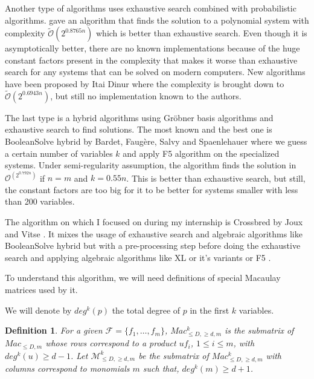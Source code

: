 \documentclass[english]{article}
\newtheorem{definition}{Definition}[section]
\begin{document}
		Another type of algorithms uses exhaustive search combined with probabilistic algorithms. \cite{LPT+17} gave an algorithm that finds the solution to a polynomial system with complexity $\tilde{\mathcal{O}}(2^{0.8765n})$ which is better than exhaustive search. Even though it is asymptotically better, there are no known implementations because of the huge constant factors present in the complexity that makes it worse than exhaustive search for any systems that can be solved on modern computers. New algorithms have been proposed by Itai Dinur \cite{Itai21A, Itai21B} where the complexity is brought down to $\tilde{\mathcal{O}}(2^{0.6943n})$, but still no implementation known to the authors.
		
		The last type is a hybrid algorithms using Gröbner basis algorithms and exhaustive search to find solutions. The most known and the best one is BooleanSolve hybrid by Bardet, Faugère, Salvy and Spaenlehauer \cite{BFSS13} where we guess a certain number of variables $k$ and apply F5 algorithm on the specialized systems. Under semi-regularity assumption, the algorithm finds the solution in $\mathcal{O}^(2^{0.792n})$ if $n = m$ and $k = 0.55n$. This is better than exhaustive search, but still, the constant factors are too big for it to be better for systems smaller with less than 200 variables.
		
		The algorithm on which I focused on during my internship is Crossbred by Joux and Vitse \cite{JV17}. It mixes the usage of exhaustive search and algebraic algorithms like BooleanSolve hybrid but with a pre-processing step before doing the exhaustive search and applying algebraic algorithms like XL \cite{CKPS00} or it's variants or F5 \cite{F02}.
		
		To understand this algorithm, we will need definitions of special Macaulay matrices used by it.
		
		We will denote by $deg^k(p)$ the total degree of $p$ in the first $k$ variables.
		
		\begin{definition}
			For a given $\mathcal{F} = \{f_1,\dots,f_m\}$, $Mac_{\leq D, \geq d, m}^k$ is the submatrix of $Mac_{\leq D, m}$ whose rows correspond to a product $uf_i$, $1 \leq i \leq m$, with $deg^k(u) \geq d-1$. Let $\mathcal{M}_{\leq D, \geq d, m}^k$ be the submatrix of $Mac_{\leq D, \geq d, m}^k$ with columns correspond to monomials $m$ such that, $deg^k(m) \geq d+1$.
		\end{definition}
		
\end{document}
